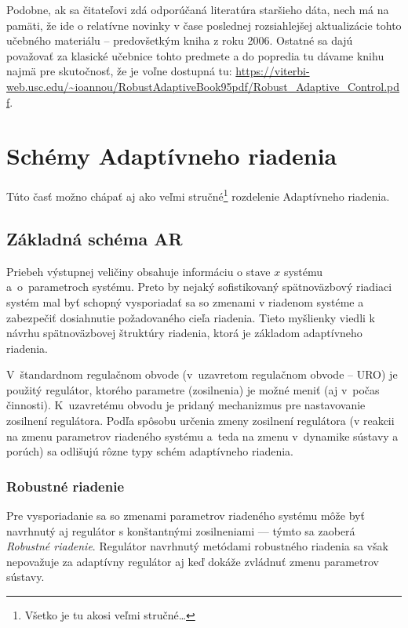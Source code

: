 \documentclass[a4paper, 10pt, ]{article}
\begin{document}
Podobne, ak sa čitateľovi zdá odporúčaná literatúra staršieho dáta, nech má na pamäti, že ide o relatívne novinky v čase poslednej rozsiahlejšej aktualizácie tohto učebného materiálu -- predovšetkým kniha \cite{IF06} z roku 2006. Ostatné sa dajú považovať za klasické učebnice tohto predmete a do popredia tu dávame knihu \cite{IS96} najmä pre skutočnosť, že je voľne dostupná tu: \url{https://viterbi-web.usc.edu/~ioannou/RobustAdaptiveBook95pdf/Robust_Adaptive_Control.pdf}.












\section{Schémy Adaptívneho riadenia}


Túto časť možno chápať aj ako veľmi stručné\footnote{Všetko je tu akosi veľmi stručné\ldots} rozdelenie Adaptívneho riadenia.


\subsection{Základná schéma AR}

Priebeh výstupnej veličiny obsahuje informáciu o stave $x$ systému a~o~parametroch systému. Preto by nejaký sofistikovaný spätnoväzbový riadiaci systém mal byť schopný vysporiadať sa so zmenami v riadenom systéme a zabezpečiť dosiahnutie požadovaného cieľa riadenia. Tieto myšlienky viedli k návrhu spätnoväzbovej štruktúry riadenia, ktorá je základom adaptívneho riadenia.

V~štandardnom regulačnom obvode (v~uzavretom regulačnom obvode -- URO) je použitý regulátor, ktorého parametre (zosilnenia) je možné meniť (aj v~počas činnosti). K~uzavretému obvodu je pridaný mechanizmus pre nastavovanie zosilnení regulátora. Podľa spôsobu určenia zmeny zosilnení regulátora (v reakcii na zmenu parametrov riadeného systému a~teda na zmenu v~dynamike sústavy a porúch) sa odlišujú rôzne typy schém adaptívneho riadenia.

\subsubsection{Robustné riadenie}

Pre vysporiadanie sa so zmenami parametrov riadeného systému môže byť navrhnutý aj regulátor s konštantnými zosilneniami --- týmto sa zaoberá \emph{Robustné riadenie}. Regulátor navrhnutý metódami robustného riadenia sa však nepovažuje za adaptívny regulátor aj keď dokáže zvládnuť zmenu parametrov sústavy.
\end{document}
